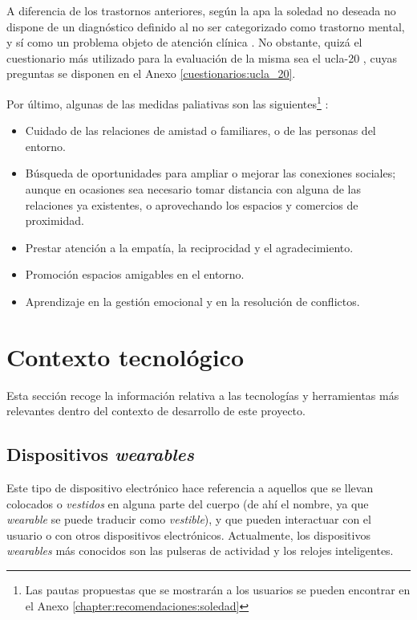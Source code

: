         
        A diferencia de los trastornos anteriores, según la \gls{apa} \cite{american_psychological_association_manual_2014} la soledad no deseada no dispone de un diagnóstico definido al no ser categorizado como trastorno mental, y sí como un problema objeto de atención clínica \cite{montejano_martin_soledad_2019}. No obstante, quizá el cuestionario más utilizado para la evaluación de la misma sea el \gls{ucla}-20 \cite{russell_revised_1980}, cuyas preguntas se disponen en el Anexo \ref{cuestionarios:ucla_20}.

        Por último, algunas de las medidas paliativas son las siguientes\footnote{Las pautas propuestas que se mostrarán a los usuarios se pueden encontrar en el Anexo \ref{chapter:recomendaciones:soledad}} \cite{cruz_roja_como_nodate}:

        \begin{itemize}
            \item Cuidado de las relaciones de amistad o familiares, o de las personas del entorno.
            \item Búsqueda de oportunidades para ampliar o mejorar las conexiones sociales; aunque en ocasiones sea necesario tomar distancia con alguna de las relaciones ya existentes, o aprovechando los espacios y comercios de proximidad.
            \item Prestar atención a la empatía, la reciprocidad y el agradecimiento.
            \item Promoción espacios amigables en el entorno.
            \item Aprendizaje en la gestión emocional y en la resolución de conflictos.
        \end{itemize}
        
\section{Contexto tecnológico}
    \label{section:contexto}

    Esta sección recoge la información relativa a las tecnologías y herramientas más relevantes dentro del contexto de desarrollo de este proyecto.

    \subsection{Dispositivos \textit{wearables}}
        \label{section:contexto:wearables}

        Este tipo de dispositivo electrónico hace referencia a aquellos que se llevan colocados o \textit{vestidos} en alguna parte del cuerpo (de ahí el nombre, ya que \textit{wearable} se puede traducir como \textit{vestible}), y que pueden interactuar con el usuario o con otros dispositivos electrónicos. Actualmente, los dispositivos \textit{wearables} más conocidos son las pulseras de actividad y los relojes inteligentes.

